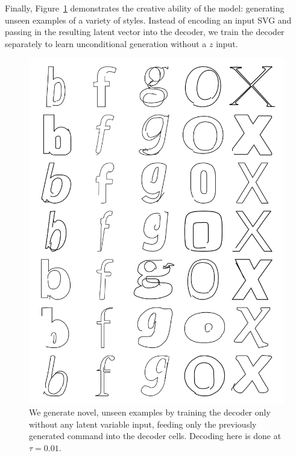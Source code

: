 Finally, Figure~\ref{fig:uncond} demonstrates the creative ability of the model: generating unseen examples of a variety of styles.
Instead of encoding an input SVG and passing in the resulting latent vector into the decoder, we train the decoder separately to learn unconditional generation without a $z$ input.
\begin{figure}[h]
    \centering
	\includegraphics[width=\textwidth]{figures/uncond}
    \caption[Unconditional generation for the single-class model on letter glyphs]
    {We generate novel, unseen examples by training the decoder only without any latent variable input, feeding only the previously generated command into the decoder cells.
    Decoding here is done at $\tau=0.01$.
    \label{fig:uncond}}
\end{figure}

